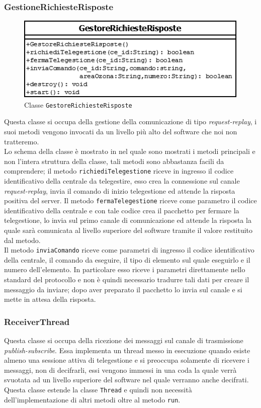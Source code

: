 \subsubsection{GestioneRichiesteRisposte}
\begin{figure}
	\centering
	\includegraphics[width=0.5\linewidth]{pictures/classgestore.png}
	\caption{Classe \texttt{GestoreRichiesteRisposte}}\label{fig:gestricclass}
\end{figure}
Questa classe si occupa della gestione della comunicazione di tipo \emph{request-replay}, i suoi metodi vengono invocati da un livello più alto del software che noi non tratteremo.\\
Lo schema della classe è mostrato in  nel quale sono mostrati i metodi principali e non l'intera struttura della classe, tali metodi sono abbastanza facili da comprendere; il metodo \texttt{richiediTelegestione} riceve in ingresso il codice identificativo della centrale da telegestire, esso crea la connessione sul canale \emph{request-replay}, invia il comando di inizio telegestione ed attende la risposta positiva del server. Il metodo \texttt{fermaTelegestione} riceve come parametro il codice identificativo della centrale e con tale codice crea il pacchetto per fermare la telegestione, lo invia sul primo canale di comunicazione ed attende la risposta la quale sarà comunicata al livello superiore del software tramite il valore restituito dal metodo.\\
Il metodo \texttt{inviaComando} riceve come parametri di ingresso il codice identificativo della centrale, il comando da eseguire, il tipo di elemento sul quale eseguirlo e il numero dell'elemento. In particolare esso riceve i parametri direttamente nello standard del protocollo e non è quindi necessario tradurre tali dati per creare il messaggio da inviare; dopo aver preparato il pacchetto lo invia sul canale e si mette in attesa della risposta.
\subsubsection{ReceiverThread}
Questa classe si occupa della ricezione dei messaggi sul canale di trasmissione \emph{publish-subscribe}. Essa implementa un thread messo in esecuzione quando esiste almeno una sessione attiva di telegestione e si preoccupa solamente di ricevere i messaggi, non di decifrarli, essi vengono immessi in una coda la quale verrà svuotata ad un livello superiore del software nel quale verranno anche decifrati.\\
Questa classe estende la classe \texttt{Thread} e quindi non necessità dell'implementazione di altri metodi oltre al metodo \texttt{run}.
